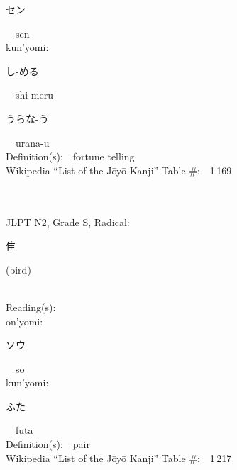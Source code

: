 \begin{multicols}{2}
{\hspace*{2em}}{\begin{CJK}{UTF8}{min} セン \end{CJK}}\ \ sen\ \ \\
{\hspace*{1em}}kun'yomi:\ \ \\
{\hspace*{2em}}{\begin{CJK}{UTF8}{min} し-める \end{CJK}}\ \ shi-meru\ \ \\
{\hspace*{2em}}{\begin{CJK}{UTF8}{min} うらな-う \end{CJK}}\ \ urana-u\ \ \\
Definition(s):\ \ fortune telling \\
Wikipedia ``List of the J\=oy\=o Kanji'' Table \#:\ \ 1\,169 \\
\ \ \\
{\fontsize{34pt}{40pt}  }\ \ \\  %
{JLPT N2, Grade S, Radical:\ \ {\begin{CJK}{UTF8}{min} 隹 \end{CJK}} (bird) } \\
Reading(s):\ \ \\
{\hspace*{1em}}on'yomi:\ \ \\
{\hspace*{2em}}{\begin{CJK}{UTF8}{min} ソウ \end{CJK}}\ \ s\=o\ \ \\
{\hspace*{1em}}kun'yomi:\ \ \\
{\hspace*{2em}}{\begin{CJK}{UTF8}{min} ふた \end{CJK}}\ \ futa\ \ \\
Definition(s):\ \ pair \\
Wikipedia ``List of the J\=oy\=o Kanji'' Table \#:\ \ 1\,217 \\
\ \ \\
{\fontsize{34pt}{40pt}  }\ \ \\  %

\end{multicols}
